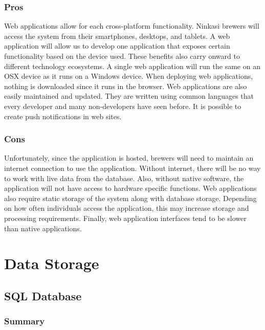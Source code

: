\documentclass[draftclsnofoot,onecolumn,letterpaper,10pt,compsoc]{IEEEtran}
\begin{document}
        \subsubsection{Pros}
            Web applications allow for each cross-platform functionality.
            Ninkasi brewers will access the system from their smartphones, desktops, and tablets.
            A web application will allow us to develop one application that exposes certain functionality based on the device used.
            These benefits also carry onward to different technology ecosystems.
            A single web application will run the same on an OSX device as it runs on a Windows device.
            When deploying web applications, nothing is downloaded since it runs in the browser.
            Web applications are also easily maintained and updated.
            They are written using common languages that every developer and many non-developers have seen before.
            It is possible to create push notifications in web sites\cite{GooglePushNotifications}.
    
        \subsubsection{Cons}
            Unfortunately, since the application is hosted, brewers will need to maintain an internet connection to use the application.
            Without internet, there will be no way to work with live data from the database.
            Also, without native software, the application will not have access to hardware specific functions.
            Web applications also require static storage of the system along with database storage.
            Depending on how often individuals access the application, this may increase storage and processing requirements.
            Finally, web application interfaces tend to be slower than native applications\cite{LifeWireOverview}.


\section{Data Storage}
	\subsection{SQL Database}
        \subsubsection{Summary}
    
\end{document}
